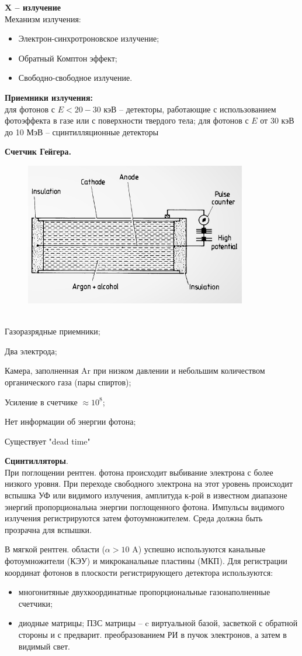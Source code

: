 \documentclass[12pt]{article}
\begin{document}
\textbf{X -- излучение}\\
Механизм излучения:
\begin{itemize}
	\item Электрон-синхротроновское излучение;
	\item Обратный Комптон эффект;
	\item Свободно-свободное излучение.
\end{itemize}
\textbf{Приемники излучения:}\\
для фотонов с $E<20-30$ кэВ -- детекторы, работающие с использованием
фотоэффекта в газе или с поверхности твердого тела;
для фотонов с $E$ от 30 кэВ до 10 МэВ -- сцинтилляционные детекторы

\newpage
\textbf{Счетчик Гейгера.}
\begin{figure}[h]
	\centering
	\includegraphics[width=0.5\linewidth]{"Снимок экрана от 2024-12-23 20-20-40"}
\end{figure}\\
Газоразрядные приемники;

Два электрода;

Камера, заполненная Ar при низком
давлении и небольшим количеством
органического газа (пары спиртов);

Усиление в счетчике $\approx10^8$;

Нет информации об энергии фотона;

Существует "dead time"


\textbf{Сцинтилляторы}.\\
При поглощении рентген. фотона происходит
выбивание электрона с более низкого уровня.
При переходе свободного электрона на этот
уровень происходит вспышка УФ или видимого
излучения, амплитуда к-рой в известном
диапазоне энергий пропорциональна энергии
поглощенного фотона. Импульсы видимого
излучения регистрируются затем
фотоумножителем.
Среда должна быть прозрачна для вспышки.


В мягкой рентген. области ($\alpha > 10$ A) успешно используются канальные
фотоумножители (КЭУ) и микроканальные пластины (МКП).
Для регистрации координат фотонов в плоскости регистрирующего детектора
используются:
\begin{itemize}
\item многонитяные двухкоординатные пропорциональные газонаполненные
счетчики;
\item диодные матрицы;
ПЗС матрицы – c виртуальной базой, засветкой с обратной стороны и
с предварит. преобразованием РИ в пучок электронов, а затем в видимый
свет.
\end{itemize}
\end{document}
